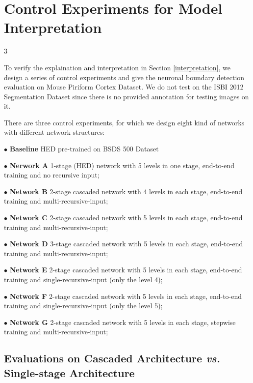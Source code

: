 \documentclass[senior]{IPSstyle}
\begin{document}
\section{Control Experiments for Model Interpretation}3

To verify the explaination and interpretation in Section \ref{interpretation}, we design a series of control experiments and give the neuronal boundary detection evaluation on Mouse Piriform Cortex Dataset\cite{Lee2015}. We do not test on the ISBI 2012 Segmentation Dataset\cite{Ronneberger2015} since there is no provided annotation for testing images on it. 

There are three control experiments, for which we design eight kind of networks with different network structures:

$\bullet$ \textbf{Baseline} HED\cite{Xie2015} pre-trained on BSDS 500 Dataset\cite{Arbelaez2011}

$\bullet$ \textbf{Nerwork A} 1-stage (HED\cite{Xie2015}) network with 5 levels in one stage, end-to-end training and no recursive input;

$\bullet$ \textbf{Network B} 2-stage cascaded network with 4 levels in each stage, end-to-end training and multi-recursive-input;

$\bullet$ \textbf{Network C} 2-stage cascaded network with 5 levels in each stage, end-to-end training and multi-recursive-input;

$\bullet$ \textbf{Network D} 3-stage cascaded network with 5 levels in each stage, end-to-end training and multi-recursive-input;

$\bullet$ \textbf{Network E} 2-stage cascaded network with 5 levels in each stage, end-to-end training and single-recursive-input (only the level 4);

$\bullet$ \textbf{Network F} 2-stage cascaded network with 5 levels in each stage, end-to-end training and single-recursive-input (only the level 5);

$\bullet$ \textbf{Network G} 2-stage cascaded network with 5 levels in each stage, stepwise training and multi-recursive-input;


\subsection{Evaluations on Cascaded Architecture \emph{vs.} Single-stage Architecture}
\end{document}
